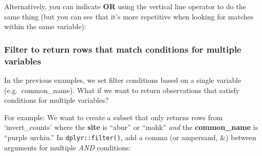 \documentclass[]{book}
\newenvironment{Shaded}{\begin{snugshade}}{\end{snugshade}}
\newcommand{\KeywordTok}[1]{\textcolor[rgb]{0.13,0.29,0.53}{\textbf{#1}}}
\newcommand{\NormalTok}[1]{#1}
\newcommand{\OperatorTok}[1]{\textcolor[rgb]{0.81,0.36,0.00}{\textbf{#1}}}
\newcommand{\StringTok}[1]{\textcolor[rgb]{0.31,0.60,0.02}{#1}}
\begin{document}
Alternatively, you can indicate \textbf{OR} using the vertical line operator \texttt{\textbar{}} to do the same thing (but you can see that it's more repetitive when looking for matches within the same variable):

\begin{Shaded}
\end{Shaded}

\hypertarget{filter-to-return-rows-that-match-conditions-for-multiple-variables}{%
\subsubsection{Filter to return rows that match conditions for multiple variables}\label{filter-to-return-rows-that-match-conditions-for-multiple-variables}}

In the previous examples, we set filter conditions based on a single variable (e.g.~common\_name). What if we want to return observations that satisfy conditions for multiple variables?

For example: We want to create a subset that only returns rows from `invert\_counts' where the \textbf{site} is ``abur'' or ``mohk'' \emph{and} the \textbf{common\_name} is ``purple urchin.'' In \texttt{dplyr::filter()}, add a comma (or ampersand, \&) between arguments for multiple \emph{AND} conditions:

\begin{Shaded}
\end{Shaded}
\end{document}

